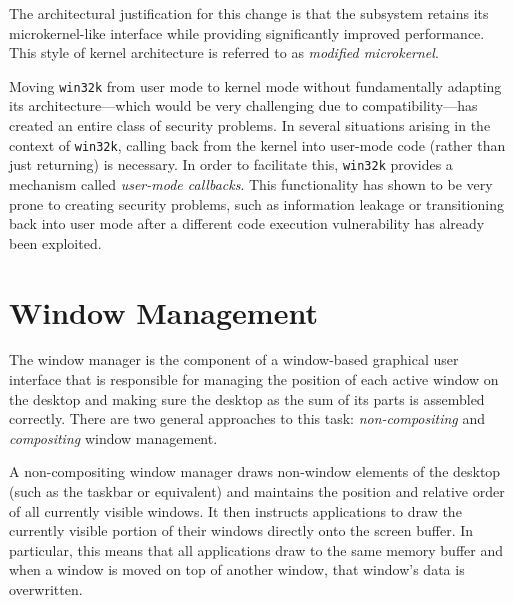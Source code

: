 			The architectural justification for this change is that the
			subsystem retains its microkernel-like interface while providing
			significantly improved performance. This style of kernel
			architecture is referred to as \emph{modified microkernel}.
			\cite{gdikernel}

			Moving \texttt{win32k} from user mode to kernel mode without
			fundamentally adapting its architecture---which would be very
			challenging due to compatibility---has created an entire class of
			security problems.  In several situations arising in the context of
			\texttt{win32k}, calling back from the kernel into user-mode code
			(rather than just returning) is necessary. In order to facilitate
			this, \texttt{win32k} provides a mechanism called \textit{user-mode
			callbacks}. This functionality has shown to be very prone to
			creating security problems, such as information leakage or
			transitioning back into user mode after a different code execution
			vulnerability has already been exploited.  \cite{mandy2011kernel}

	\section{Window Management}\label{sec:wm}
			The window manager is the component of a window-based graphical user
			interface that is responsible for managing the position of each active
			window on the desktop and making sure the desktop as the sum of its
			parts is assembled correctly. There are two general approaches to this
			task: \emph{non-compositing} and \emph{compositing} window management.

			A non-compositing window manager draws non-window elements of the
			desktop (such as the taskbar or equivalent) and maintains the
			position and relative order of all currently visible windows. It
			then instructs applications to draw the currently visible portion
			of their windows directly onto the screen buffer. In particular,
			this means that all applications draw to the same memory buffer and
			when a window is moved on top of another window, that window's data
			is overwritten.

